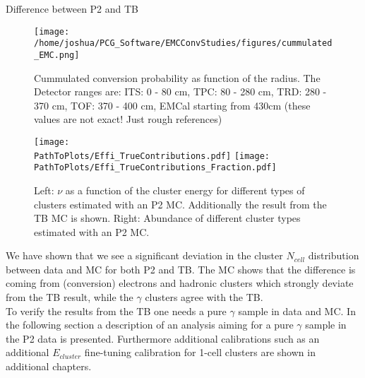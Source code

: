 \documentclass[ALICE]{ALICE_analysis_notes}
\newcommand{\g}{$\gamma$\xspace}
\newcommand{\PathToPlots}{/home/joshua/PCG_Software/EMCal_NCellEffi/13TeVNomB_Wide/Pi0Tagging_13TeV_nom_04_26_WithTRD_WithBorderCells_1cellFT/pdf}
\begin{document}
\begin{section}{Difference between P2 and TB}
\begin{figure}[t]
	\centering
	\texttt{[image: /home/joshua/PCG\_Software/EMCConvStudies/figures/cummulated\_EMC.png]}
	\caption{Cummulated conversion probability as function of the radius. The Detector ranges are: ITS: 0 - 80 cm, TPC: 80 - 280 cm, TRD: 280 - 370 cm, TOF: 370 - 400 cm, EMCal starting from 430cm (these values are not exact! Just rough references) }
	\label{fig:NCells_Conversions}
\end{figure}


\begin{figure}[t]
	\centering
	\texttt{[image: \\PathToPlots/Effi\_TrueContributions.pdf]}
	\texttt{[image: \\PathToPlots/Effi\_TrueContributions\_Fraction.pdf]}
	\caption{Left: $\nu$ as a function of the cluster energy for different types of clusters estimated with an P2 MC. Additionally the result from the TB MC is shown. Right: Abundance of different cluster types estimated with an P2 MC.}
	\label{fig:NCells_Conversions2}
\end{figure}


We have shown that we see a significant deviation in the cluster $N_{cell}$ distribution between data and MC for both P2 and TB. The MC shows that the difference is coming from (conversion) electrons and hadronic clusters which strongly deviate from the TB result, while the $\gamma$ clusters agree with the TB.\\
To verify the results from the TB one needs a pure \g sample in data and MC. In the following section a description of an analysis aiming for a pure \g sample in the P2 data is presented.
Furthermore additional calibrations such as an additional $E_{cluster}$ fine-tuning calibration for 1-cell clusters are shown in additional chapters.
\end{section}
\end{document}
